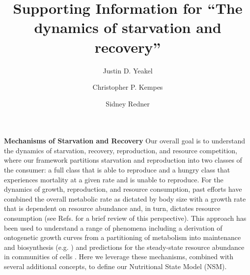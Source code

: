 \documentclass[twocolumn,preprintnumbers,amsmath,amssymb,superscriptaddress]{revtex4}
\begin{document}
\author{Justin D. Yeakel} 

\author{Christopher P. Kempes} 

\author{Sidney Redner} 

\title{ Supporting Information for ``The dynamics of starvation and recovery''}%



\maketitle




\clearpage



{\bf Mechanisms of Starvation and Recovery}
Our overall goal is to understand the dynamics of starvation, recovery, reproduction, and resource competition, where our framework partitions starvation and reproduction into two classes of the consumer: a full class that is able to reproduce and a hungry class that experiences mortality at a given rate and is unable to reproduce. For the dynamics of growth, reproduction, and resource consumption, past efforts have combined the overall metabolic rate as dictated by body size with a growth rate that is dependent on resource abundance and, in turn, dictates resource consumption (see Refs. \citep{Kempes:2012hy,kempes2014morphological} for a brief review of this perspective). This approach has been used to understand a range of phenomena including a derivation of ontogenetic growth curves from a partitioning of metabolism into maintenance and biosynthesis (e.g. \citep{West:2001bv,moses2008rmo,hou,Kempes:2012hy}) and predictions for the steady-state resource abundance in communities of cells \citep{kempes2014morphological}. Here we leverage these mechanisms, combined with several additional concepts, to define our Nutritional State Model (NSM).
\end{document}
